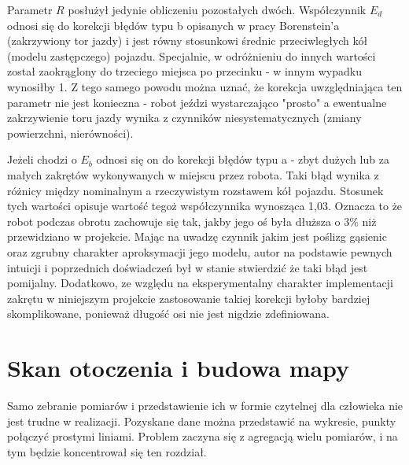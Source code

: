 Parametr $R$ posłużył jedynie obliczeniu pozostałych dwóch. Współczynnik $E_{d}$ odnosi się do korekcji błędów typu b opisanych w pracy Borenstein'a (zakrzywiony tor jazdy) i jest równy stosunkowi średnic przeciwległych kół (modelu zastępczego) pojazdu. Specjalnie, w odróżnieniu do innych wartości został zaokrąglony do trzeciego miejsca po przecinku - w innym wypadku wynosiłby 1. Z tego samego powodu można uznać, że korekcja uwzględniająca ten parametr nie jest konieczna - robot jeździ wystarczająco "prosto" a ewentualne zakrzywienie toru jazdy wynika z czynników niesystematycznych (zmiany powierzchni, nierówności).

Jeżeli chodzi o $E_{b}$ odnosi się on do korekcji błędów typu a - zbyt dużych lub za małych zakrętów wykonywanych w miejscu przez robota. Taki błąd wynika z różnicy między nominalnym a rzeczywistym rozstawem kół pojazdu. Stosunek tych wartości opisuje wartość tegoż współczynnika wynosząca 1,03. Oznacza to że robot podczas obrotu zachowuje się tak, jakby jego oś była dłuższa o 3\% niż przewidziano w projekcie. Mając na uwadzę czynnik jakim jest poślizg gąsienic oraz zgrubny charakter aproksymacji jego modelu, autor na podstawie pewnych intuicji i poprzednich doświadczeń był w stanie stwierdzić że taki błąd jest pomijalny. Dodatkowo, ze względu na eksperymentalny charakter implementacji zakrętu w niniejszym projekcie zastosowanie takiej korekcji byłoby bardziej skomplikowane, ponieważ długość osi nie jest nigdzie zdefiniowana.

\section{Skan otoczenia i budowa mapy}
\label{sec:scan}
Samo zebranie pomiarów i przedstawienie ich w formie czytelnej dla człowieka nie jest trudne w realizacji. Pozyskane dane można przedstawić na wykresie, punkty połączyć prostymi liniami. Problem zaczyna się z agregacją wielu pomiarów, i na tym będzie koncentrował się ten rozdział.


